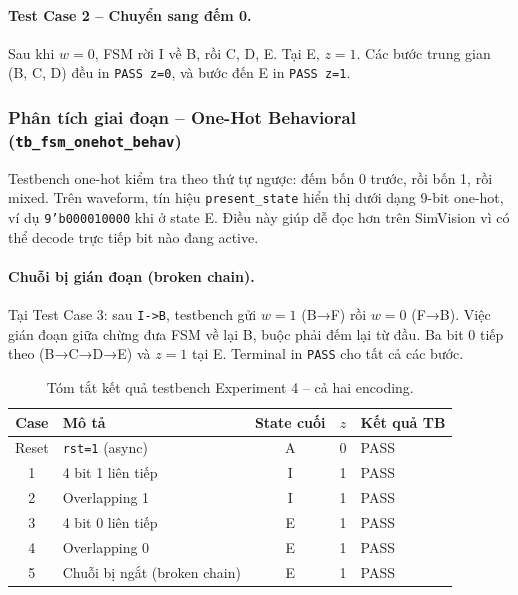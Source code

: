 \documentclass[12pt, a4paper]{article}
\begin{document}
\paragraph{Test Case 2 -- Chuyển sang đếm 0.}
Sau khi $w = 0$, FSM rời I về B, rồi C, D, E. Tại E, $z = 1$. Các bước trung gian (B, C, D) đều in \texttt{PASS z=0}, và bước đến E in \texttt{PASS z=1}.

\subsubsection{Phân tích giai đoạn -- One-Hot Behavioral (\texttt{tb\_fsm\_onehot\_behav})}

Testbench one-hot kiểm tra theo thứ tự ngược: đếm bốn 0 trước, rồi bốn 1, rồi mixed. Trên waveform, tín hiệu \texttt{present\_state} hiển thị dưới dạng 9-bit one-hot, ví dụ \texttt{9'b000010000} khi ở state E. Điều này giúp dễ đọc hơn trên SimVision vì có thể decode trực tiếp bit nào đang active.

\paragraph{Chuỗi bị gián đoạn (broken chain).}
Tại Test Case 3: sau \texttt{I->B}, testbench gửi $w = 1$ (B→F) rồi $w = 0$ (F→B). Việc gián đoạn giữa chừng đưa FSM về lại B, buộc phải đếm lại từ đầu. Ba bit 0 tiếp theo (B→C→D→E) và $z = 1$ tại E. Terminal in \texttt{PASS} cho tất cả các bước.

\begin{table}[H]
\centering
\caption{Tóm tắt kết quả testbench Experiment 4 -- cả hai encoding.}
\label{tab:wave-exp4}
\begin{tabular}{clccl}
\toprule
\textbf{Case} & \textbf{Mô tả} & \textbf{State cuối} & \textbf{$z$} & \textbf{Kết quả TB} \\
\midrule
Reset  & \texttt{rst=1} (async)       & A & 0 & PASS \\
1      & 4 bit 1 liên tiếp            & I & 1 & PASS \\
2      & Overlapping 1                & I & 1 & PASS \\
3      & 4 bit 0 liên tiếp            & E & 1 & PASS \\
4      & Overlapping 0                & E & 1 & PASS \\
5      & Chuỗi bị ngắt (broken chain) & E & 1 & PASS \\
\bottomrule
\end{tabular}
\end{table}
\end{document}
